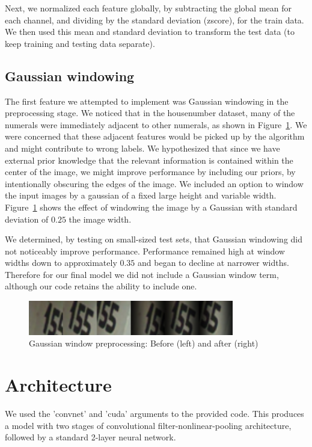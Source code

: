 \documentclass{article}
\begin{document}
Next, we normalized each feature globally, by subtracting the global mean for
each channel, and dividing by the standard deviation (zscore), for the train
data. We then used this mean and standard deviation to transform the test data
(to keep training and testing data separate).

\subsection{Gaussian windowing}
The first feature we attempted to implement was Gaussian windowing in the preprocessing stage. We noticed that in the housenumber dataset, many of the numerals were immediately adjacent to other numerals, as shown in Figure~\ref{fig1}. We were concerned that these adjacent features would be picked up by the algorithm and might contribute to wrong labels. We hypothesized that since we have external prior knowledge that the relevant information is contained within the center of the image, we might improve performance by including our priors, by intentionally obscuring the edges of the image. We included an option to window the input images by a gaussian of a fixed large height and variable width. Figure~\ref{fig1} shows the effect of windowing the image by a Gaussian with standard deviation of $0.25$ the image width. 

We determined, by testing on small-sized test sets, that Gaussian windowing did not noticeably improve performance. Performance remained high at window widths down to approximately $0.35$ and began to decline at narrower widths. Therefore for our final model we did not include a Gaussian window term, although our code retains the ability to include one.

\begin{figure}[h]
          \centering
          \includegraphics[width=0.8\textwidth]{housenumbers_win.png}
          \caption{Gaussian window preprocessing: Before (left) and after (right)}
          \label{fig1}
\end{figure}

\section{Architecture}

We used the 'convnet' and 'cuda' arguments to the provided code. This produces a model with two stages of convolutional filter-nonlinear-pooling architecture, followed by a standard 2-layer neural network.
\end{document}
